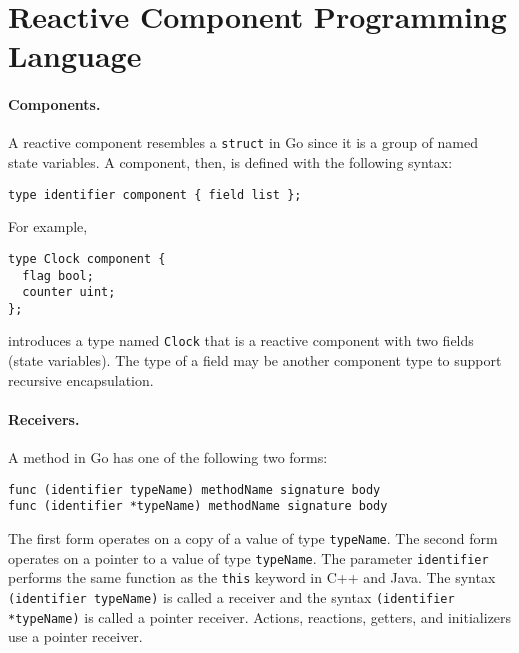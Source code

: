 
\section{Reactive Component Programming Language}

\paragraph{Components.}
A reactive component resembles a \verb+struct+ in Go since it is a group of named state variables.
A component, then, is defined with the following syntax:
\begin{verbatim}
type identifier component { field list };
\end{verbatim}
For example,
\begin{verbatim}
type Clock component {
  flag bool;
  counter uint;
};
\end{verbatim}
introduces a type named \verb+Clock+ that is a reactive component with two fields (state variables).
The type of a field may be another component type to support recursive encapsulation.

\paragraph{Receivers.}
A method in Go has one of the following two forms:
\begin{verbatim}
func (identifier typeName) methodName signature body
func (identifier *typeName) methodName signature body
\end{verbatim}
The first form operates on a copy of a value of type \verb+typeName+.
The second form operates on a pointer to a value of type \verb+typeName+.
The parameter \verb+identifier+ performs the same function as the \verb+this+ keyword in C++ and Java.
The syntax \verb+(identifier typeName)+ is called a receiver and the syntax \verb+(identifier *typeName)+ is called a pointer receiver.
Actions, reactions, getters, and initializers use a pointer receiver.

